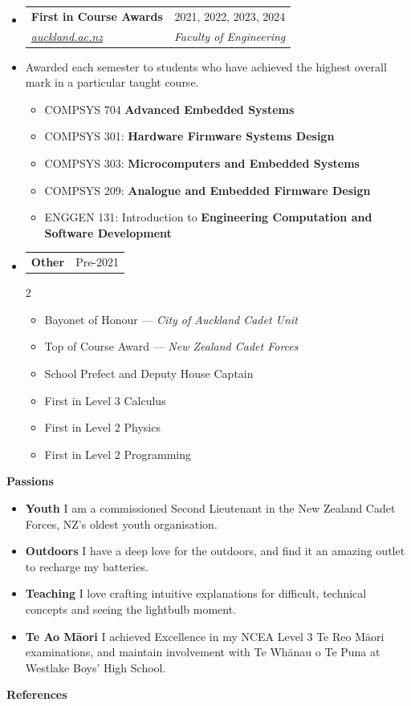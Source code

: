 \documentclass[11pt,a4paper]{article}[leftmargin=*]
\makeatletter
\def \entryspacing {-0pt}
\def \bulletstylei {\faAngleRight\hspace{-4.5pt}}
\renewcommand{\section}[2]{\vspace{5pt}
  \colorbox{secondary}{\color{white}\raggedbottom\normalsize\textbf{{#1}{\hspace{2pt}#2\hspace{4pt}}}}
}
\newcommand{\resumeEntryStart}{\begin{itemize}[leftmargin=2.5mm]}
\newcommand{\resumeEntryEnd}{\end{itemize}\vspace{\entryspacing}}
\newcommand{\resumeItemListStart}{\begin{itemize}[leftmargin=4.5mm]}
\newcommand{\resumeItemListEnd}{\end{itemize}}
\newcommand{\resumeItemListStartColumns}[2][-0.5]{\vspace*{#1\multicolsep}
\begin{multicols}{#2}\begin{itemize}[leftmargin=4.5mm]}
\newcommand{\resumeItemListEndColumns}[1][-1]{\end{itemize}\end{multicols}\vspace*{#1\multicolsep}}
\newcommand{\resumeItem}[2][\bulletstylei]{
  \item[\small#1]\small{
    {#2 \vspace{-2pt}}
  }
}
\newcommand{\resumeEntryTSDL}[4]{
  \vspace{-1pt}\item[]
    \begin{tabularx}{0.97\textwidth}{X@{\hspace{60pt}}r}
      \textbf{\color{primary}#1} & {\firabook\color{accent}\small#2} \\
      \textit{\color{accent}\small#3} & \textit{\color{accent}\small#4} \\
    \end{tabularx}\vspace{-6pt}
}
\newcommand{\resumeEntryTD}[2]{
  \vspace{-1pt}\item[]
    \begin{tabularx}{0.97\textwidth}{X@{\hspace{60pt}}r}
      \textbf{\color{primary}#1} & {\firabook\color{accent}\small#2} \\
    \end{tabularx}\vspace{-6pt}
}
\newcommand{\resumeEntryS}[2]{
  \item[]\small{
    \textbf{\color{primary}#1 }{ #2 \vspace{-4pt}}
  }
}
\newcommand{\resumeEntryP}[1]{
  \item[]\small{
    #1 \vspace{-4pt}
  }\\
}
\newcommand{\resumeIt}[1]{\textit{\color{accent}#1}}
\newcommand{\resumeBf}[1]{\small\textbf{\color{halfbold}#1}}
\makeatother
\begin{document}
\resumeEntryStart
\resumeEntryTSDL
{First in Course Awards}{2021, 2022, 2023, 2024}
{\href{https://www.auckland.ac.nz/assets/study/scholarships-and-funding/find-a-scholarship-or-award/regulations/first-in-course-award.pdf}{auckland.ac.nz}}{Faculty of Engineering}
\resumeEntryP {Awarded each semester to students who have achieved the highest overall mark in a particular taught course.}
\resumeItemListStart
\resumeItem {COMPSYS 704 \resumeBf{Advanced Embedded Systems}}
\resumeItem {COMPSYS 301: \resumeBf{Hardware Firmware Systems Design}}
\resumeItem {COMPSYS 303: \resumeBf{Microcomputers and Embedded Systems}}
\resumeItem {COMPSYS 209: \resumeBf{Analogue and Embedded Firmware Design}}
\resumeItem {ENGGEN 131: Introduction to \resumeBf{Engineering Computation and Software Development}}
\resumeItemListEnd
\resumeEntryEnd

\resumeEntryStart
\resumeEntryTD
{Other}{Pre-2021}
\resumeItemListStartColumns{2}
\resumeItem {Bayonet of Honour --- \resumeIt{City of Auckland Cadet Unit}}
\resumeItem {Top of Course Award --- \resumeIt{New Zealand Cadet Forces}}
\resumeItem {School Prefect and Deputy House Captain}
\resumeItem {First in Level 3 Calculus}
\resumeItem {First in Level 2 Physics}
\resumeItem {First in Level 2 Programming}
\resumeItemListEndColumns
\resumeEntryEnd


\section{\faUserCircle}{Passions}

\resumeEntryStart
\resumeEntryS
{Youth}
{
  I am a commissioned Second Lieutenant in the New Zealand Cadet Forces, NZ's oldest youth organisation.
}

\resumeEntryS
{Outdoors}
{
  I have a deep love for the outdoors, and find it an amazing outlet to recharge my batteries.
}

\resumeEntryS
{Teaching}
{
  I love crafting intuitive explanations for difficult, technical concepts and seeing the lightbulb moment.
}

\resumeEntryS
{Te Ao Māori}
{
  I achieved Excellence in my NCEA Level 3 Te Reo Māori examinations, and maintain involvement with Te Whānau o Te Puna at Westlake Boys' High School.
}
\resumeEntryEnd


\section{\faUserCheck}{References}
\end{document}
